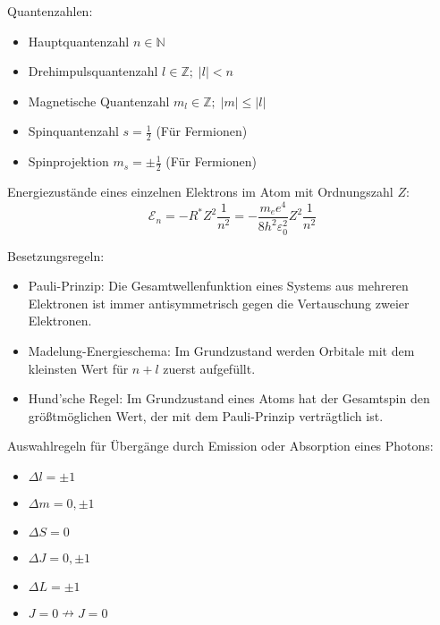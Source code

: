\documentclass[11pt]{article}
\numberwithin{equation}{section}
\begin{document}
        Quantenzahlen:
        \begin{itemize}
          \item Hauptquantenzahl $n \in \mathbb{N}$
          \item Drehimpulsquantenzahl $l \in \mathbb{Z};\; \left|l\right| < n$
          \item Magnetische Quantenzahl $m_l \in \mathbb{Z};\; \left|m\right| \le \left|l\right|$
          \item Spinquantenzahl $s = \frac{1}{2}$ (Für Fermionen)
          \item Spinprojektion $m_s = \pm \frac{1}{2}$ (Für Fermionen)
        \end{itemize}

        Energiezustände eines einzelnen Elektrons im Atom mit Ordnungszahl $Z$:
        \begin{equation}
          \mathcal{E}_n = -R^* Z^2 \frac{1}{n^2} = - \frac{m_e e^4}{8 h^2 \varepsilon_0^2} Z^2 \frac{1}{n^2}
        \end{equation}

        Besetzungsregeln:
        \begin{itemize}
          \item Pauli-Prinzip: Die Gesamtwellenfunktion eines Systems aus mehreren Elektronen ist immer antisymmetrisch  gegen die Vertauschung zweier Elektronen.
          \item Madelung-Energieschema: Im Grundzustand werden Orbitale mit dem kleinsten Wert für $n+l$ zuerst aufgefüllt.
          \item Hund'sche Regel: Im Grundzustand eines Atoms hat der Gesamtspin den größtmöglichen Wert, der mit dem Pauli-Prinzip verträgtlich ist.
        \end{itemize}

        Auswahlregeln für Übergänge durch Emission oder Absorption eines Photons:
        \begin{itemize}
          \item $\Delta l = \pm 1$
          \item $\Delta m = 0, \pm 1$
          \item $\Delta S = 0$
          \item $\Delta J = 0, \pm 1$
          \item $\Delta L = \pm 1$
          \item $J=0 \nrightarrow J=0$
        \end{itemize}
\end{document}
